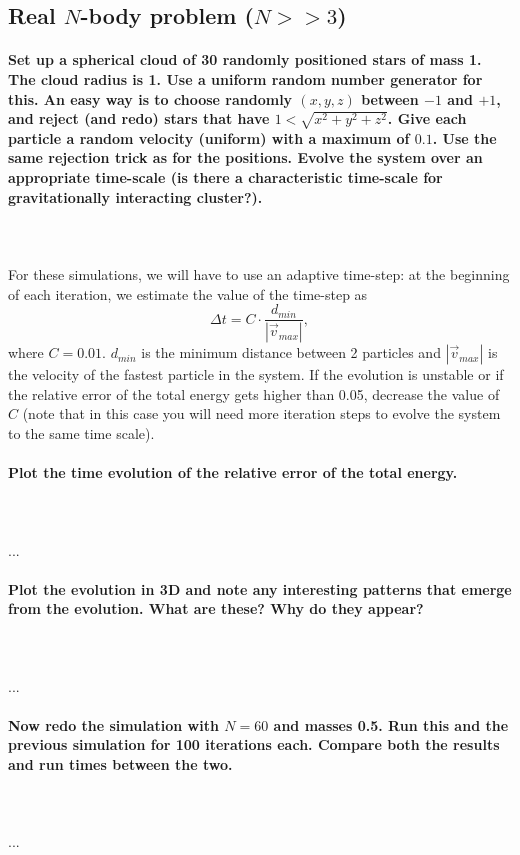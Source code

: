 \newpage
\subsection{Real $N$-body problem ($N>>3$)}
    \paragraph{Set up a spherical cloud of 30 randomly positioned stars of 
        mass 1. The cloud radius is 1. Use a uniform random number generator 
        for this. An easy way is to choose randomly $(x,y,z)$ between 
        $-1$ and $+1$, and reject (and redo) stars that have 
        $1<\sqrt{x^2+y^2+z^2}$. Give each particle a random velocity
        (uniform) with a maximum of $0.1$. Use the same rejection trick as for 
        the positions. Evolve the system over an appropriate time-scale 
        (is there a characteristic time-scale for gravitationally interacting
        cluster?). 
    } \ \\
        \\
        For these simulations, we will have to use an adaptive time-step: at the 
        beginning of each iteration, we estimate the value of the time-step as 
        \begin{equation}
            \Delta t = C\cdot\frac{d_{min}}{|\vec v_{max}|},
        \end{equation}
        where $C=0.01$. $d_{min}$ is the minimum distance between 2 particles 
        and $|\vec v_{max}|$ is the velocity of the fastest particle in the 
        system. If the evolution is unstable or if the relative error of the 
        total energy gets higher than 0.05, decrease the value of $C$ (note 
        that in this case you will need more iteration steps to evolve the 
        system to the same time scale).

    \paragraph{Plot the time evolution of the relative error of the total 
        energy.
    } \ \\
        \\ 
        ...

    \paragraph{Plot the evolution in 3D and note any interesting patterns that 
        emerge from the evolution. What are these? Why do they appear?
    } \ \\
        \\
        ...

    \paragraph{Now redo the simulation with $N=60$ and masses 0.5. Run this and 
        the previous simulation for 100 iterations each. Compare both the 
        results and run times between the two.
    } \ \\
        \\
        ...

